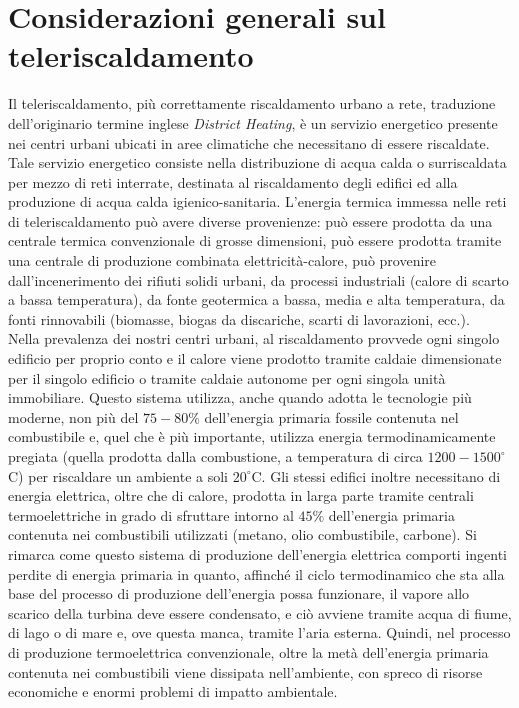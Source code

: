 \documentclass[laurea,oneside,11pt]{USiena_tesiLM}
\begin{document}
\section{Considerazioni generali sul teleriscaldamento}
Il teleriscaldamento, più correttamente riscaldamento urbano a rete, traduzione dell'originario termine inglese \textit{District Heating}, è un servizio energetico presente nei centri urbani ubicati in aree climatiche che necessitano di essere riscaldate.
Tale servizio energetico consiste nella distribuzione di acqua calda o surriscaldata per mezzo di reti interrate, destinata al riscaldamento degli edifici ed alla produzione di acqua calda igienico-sanitaria.
L'energia termica immessa nelle reti di teleriscaldamento può avere diverse provenienze: può essere prodotta da una centrale termica convenzionale di grosse dimensioni, può essere prodotta tramite una centrale di produzione combinata elettricità-calore, può provenire dall'incenerimento dei rifiuti solidi urbani, da processi industriali (calore di scarto a bassa temperatura), da fonte geotermica a bassa, media e alta temperatura, da fonti rinnovabili (biomasse, biogas da discariche, scarti di lavorazioni, ecc.).\\

Nella prevalenza dei nostri centri urbani, al riscaldamento provvede ogni singolo edificio per proprio conto e il calore viene prodotto tramite caldaie dimensionate per il singolo edificio o tramite caldaie autonome per ogni singola unità immobiliare.
Questo sistema utilizza, anche quando adotta le tecnologie più moderne, non più del $75-80\%$ dell'energia primaria fossile contenuta nel combustibile e, quel che è più importante, utilizza energia termodinamicamente pregiata (quella prodotta dalla combustione, a temperatura di circa $1200-1500 ^{\circ}$C) per riscaldare un ambiente a soli $20 ^{\circ}$C.
Gli stessi edifici inoltre necessitano di energia elettrica, oltre che di calore, prodotta in larga parte tramite centrali termoelettriche in grado di sfruttare intorno al $45\%$ dell'energia primaria contenuta nei combustibili utilizzati (metano, olio combustibile, carbone).
Si rimarca come questo sistema di produzione dell'energia elettrica comporti ingenti perdite di energia primaria in quanto, affinché il ciclo termodinamico che sta alla base del processo di produzione dell'energia possa funzionare, il vapore allo scarico della turbina deve essere condensato, e ciò avviene tramite acqua di fiume, di lago o di mare e, ove questa manca, tramite l'aria esterna. Quindi, nel processo di produzione termoelettrica convenzionale, oltre la metà dell'energia primaria contenuta nei combustibili viene dissipata nell'ambiente, con spreco di risorse economiche e enormi problemi di impatto ambientale.\\
\end{document}
